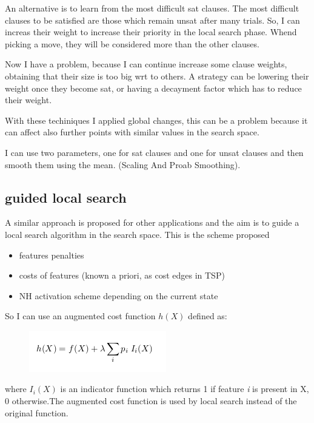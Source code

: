 \documentclass[11pt]{article}
\begin{document}
An alternative is to learn from the most difficult sat clauses. The most difficult clauses to be satisfied are those which remain unsat after many trials. So, I can increas their weight to increase their priority in the local search phase. Whend picking a move, they will be considered more than the other clauses. 

Now I have a problem, because I can continue increase some clause weights, obtaining that their size is too big wrt to others. A strategy can be lowering their weight once they become sat, or having a decayment factor which has to reduce their weight. 

With these techiniques I applied global changes, this can be a problem because it can affect also further points with similar values in the search space.

I can use two parameters, one for sat clauses and one for unsat clauses and then smooth them using the mean. (Scaling And Proab Smoothing).

\subsection{guided local search}
A similar approach is proposed for other applications and the aim is to guide a local search algorithm in the search space. 
This is the scheme proposed

\begin{itemize}
\item features penalties
\item costs of features (known a priori, as cost edges in TSP)
\item NH activation scheme depending on the current state 
\end{itemize}

So I can use an augmented cost function $ h(X) $ defined as:

\begin{figure}[H]
\includegraphics[scale=0.50]{augmented}
\centering
\end{figure}

where $ I_i(X) $ is an indicator function which returns 1 if feature  \textit{i} is present in X, 0 otherwise.The augmented cost
function is used by local search instead of the original function.
	
\end{document}
